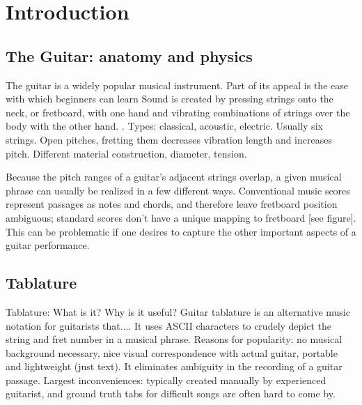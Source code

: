 \documentclass[12pt]{cmuthesis}
\begin{document}
%
%
%
%
%


\chapter{Introduction}
\doublespacing

\section{The Guitar: anatomy and physics}
The guitar is a widely popular musical instrument. Part of its appeal is the ease with which beginners can learn
Sound is created by pressing strings onto the neck, or fretboard, with one hand and vibrating combinations of strings over the body with the other hand. . Types: classical, acoustic, electric. Usually six strings. Open pitches, fretting them decreases vibration length and increases pitch. Different material construction, diameter, tension.

Because the pitch ranges of a guitar's adjacent strings overlap, a given musical phrase can usually be realized in a few different ways. Conventional music scores represent passages as notes and chords, and therefore leave fretboard position ambiguous; standard scores don't have a unique mapping to fretboard [see figure]. This can be problematic if one desires to capture the other important aspects of a guitar performance.

\section{Tablature}
Tablature: What is it? Why is it useful?
Guitar tablature is an alternative music notation for guitarists that.... It uses ASCII characters to crudely depict the string and fret number in a musical phrase. Reasons for popularity: no musical background necessary, nice visual correspondence with actual guitar, portable and lightweight (just text). It eliminates ambiguity in the recording of a guitar passage. Largest inconveniences: typically created manually by experienced guitarist, and ground truth tabs for difficult songs are often hard to come by.
\end{document}
